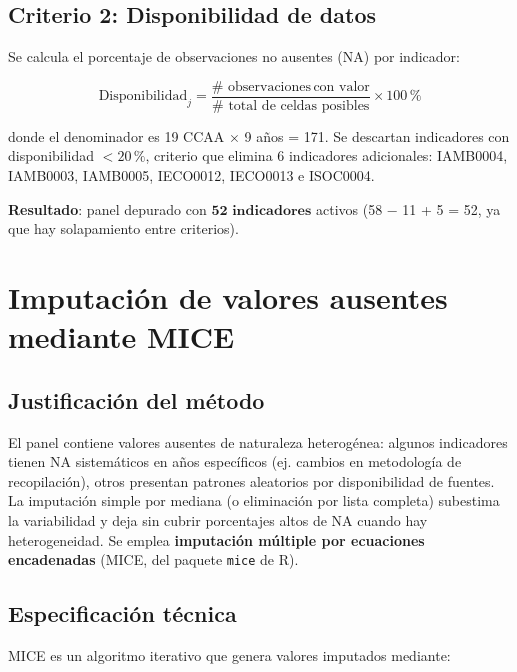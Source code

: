 \subsection{Criterio 2: Disponibilidad de datos}

Se calcula el porcentaje de observaciones no ausentes (NA) por indicador:

\begin{equation}
    \text{Disponibilidad}_j = \frac{\text{# observaciones} \, \text{con valor}}{\text{# total de celdas posibles}} \times 100\,\%
\end{equation}

donde el denominador es 19 CCAA $\times$ 9 años = 171. Se descartan indicadores con disponibilidad $< 20\,\%$, criterio que elimina 6 indicadores adicionales: IAMB0004, IAMB0003, IAMB0005, IECO0012, IECO0013 e ISOC0004.

\textbf{Resultado}: panel depurado con $\mathbf{52 \text{ indicadores}}$ activos (58 − 11 + 5 = 52, ya que hay solapamiento entre criterios).

\section{Imputación de valores ausentes mediante MICE}

\subsection{Justificación del método}

El panel contiene valores ausentes de naturaleza heterogénea: algunos indicadores tienen NA sistemáticos en años específicos (ej. cambios en metodología de recopilación), otros presentan patrones aleatorios por disponibilidad de fuentes. La imputación simple por mediana (o eliminación por lista completa) subestima la variabilidad y deja sin cubrir porcentajes altos de NA cuando hay heterogeneidad. Se emplea \textbf{imputación múltiple por ecuaciones encadenadas} (MICE, del paquete \texttt{mice} de R).

\subsection{Especificación técnica}

MICE es un algoritmo iterativo que genera valores imputados mediante:

